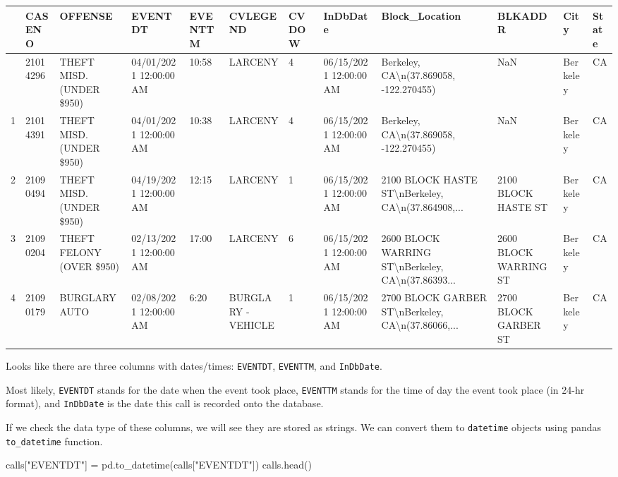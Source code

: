 \documentclass[
  letterpaper,
  DIV=11,
  numbers=noendperiod]{scrreprt}
\newenvironment{Shaded}{\begin{snugshade}}{\end{snugshade}}
\newcommand{\NormalTok}[1]{\textcolor[rgb]{0.00,0.23,0.31}{#1}}
\newcommand{\OperatorTok}[1]{\textcolor[rgb]{0.37,0.37,0.37}{#1}}
\newcommand{\StringTok}[1]{\textcolor[rgb]{0.13,0.47,0.30}{#1}}
\begin{document}
\begin{longtable}[]{@{}llllllllllll@{}}
\toprule\noalign{}
& CASENO & OFFENSE & EVENTDT & EVENTTM & CVLEGEND & CVDOW & InDbDate &
Block\_Location & BLKADDR & City & State \\
\midrule\noalign{}
\endhead
\bottomrule\noalign{}
\endlastfoot
0 & 21014296 & THEFT MISD. (UNDER \$950) & 04/01/2021 12:00:00 AM &
10:58 & LARCENY & 4 & 06/15/2021 12:00:00 AM & Berkeley,
CA\textbackslash n(37.869058, -122.270455) & NaN & Berkeley & CA \\
1 & 21014391 & THEFT MISD. (UNDER \$950) & 04/01/2021 12:00:00 AM &
10:38 & LARCENY & 4 & 06/15/2021 12:00:00 AM & Berkeley,
CA\textbackslash n(37.869058, -122.270455) & NaN & Berkeley & CA \\
2 & 21090494 & THEFT MISD. (UNDER \$950) & 04/19/2021 12:00:00 AM &
12:15 & LARCENY & 1 & 06/15/2021 12:00:00 AM & 2100 BLOCK HASTE
ST\textbackslash nBerkeley, CA\textbackslash n(37.864908,... & 2100
BLOCK HASTE ST & Berkeley & CA \\
3 & 21090204 & THEFT FELONY (OVER \$950) & 02/13/2021 12:00:00 AM &
17:00 & LARCENY & 6 & 06/15/2021 12:00:00 AM & 2600 BLOCK WARRING
ST\textbackslash nBerkeley, CA\textbackslash n(37.86393... & 2600 BLOCK
WARRING ST & Berkeley & CA \\
4 & 21090179 & BURGLARY AUTO & 02/08/2021 12:00:00 AM & 6:20 & BURGLARY
- VEHICLE & 1 & 06/15/2021 12:00:00 AM & 2700 BLOCK GARBER
ST\textbackslash nBerkeley, CA\textbackslash n(37.86066,... & 2700 BLOCK
GARBER ST & Berkeley & CA \\
\end{longtable}

Looks like there are three columns with dates/times: \texttt{EVENTDT},
\texttt{EVENTTM}, and \texttt{InDbDate}.

Most likely, \texttt{EVENTDT} stands for the date when the event took
place, \texttt{EVENTTM} stands for the time of day the event took place
(in 24-hr format), and \texttt{InDbDate} is the date this call is
recorded onto the database.

If we check the data type of these columns, we will see they are stored
as strings. We can convert them to \texttt{datetime} objects using
pandas \texttt{to\_datetime} function.

\begin{Shaded}
\begin{Highlighting}[]
\NormalTok{calls[}\StringTok{"EVENTDT"}\NormalTok{] }\OperatorTok{=}\NormalTok{ pd.to\_datetime(calls[}\StringTok{"EVENTDT"}\NormalTok{])}
\NormalTok{calls.head()}
\end{Highlighting}
\end{Shaded}
\end{document}
